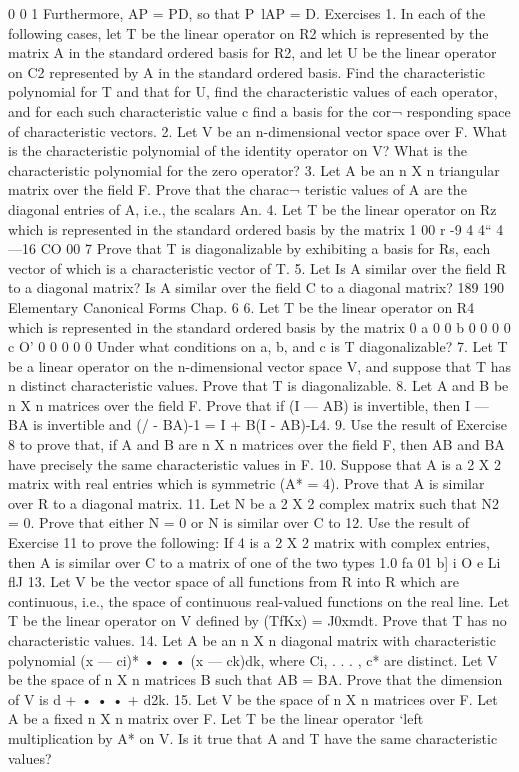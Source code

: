 0 0 1 Furthermore, AP = PD, so that P~lAP = D. Exercises 1. In each of the following cases, let T be the linear operator on R2 which is represented by the matrix A in the standard ordered basis for R2, and let U be the linear operator on C2 represented by A in the standard ordered basis. Find the characteristic polynomial for T and that for U, find the characteristic values of each operator, and for each such characteristic value c find a basis for the cor¬ responding space of characteristic vectors. 2. Let V be an n-dimensional vector space over F. What is the characteristic polynomial of the identity operator on V? What is the characteristic polynomial for the zero operator? 3. Let A be an n X n triangular matrix over the field F. Prove that the charac¬ teristic values of A are the diagonal entries of A, i.e., the scalars An. 4. Let T be the linear operator on Rz which is represented in the standard ordered basis by the matrix 1 00 r -9 4 4“ 4  —16 CO 00 7 Prove that T is diagonalizable by exhibiting a basis for Rs, each vector of which is a characteristic vector of T. 5. Let Is A similar over the field R to a diagonal matrix? Is A similar over the field C to a diagonal matrix? 189 190 Elementary Canonical Forms Chap. 6 6. Let T be the linear operator on R4 which is represented in the standard ordered basis by the matrix 0 a 0 0 b 0 0 0 0 c O' 0 0 0 0 0 Under what conditions on a, b, and c is T diagonalizable? 7. Let T be a linear operator on the n-dimensional vector space V, and suppose that T has n distinct characteristic values. Prove that T is diagonalizable. 8. Let A and B be n X n matrices over the field F. Prove that if (I — AB) is invertible, then I — BA is invertible and (/ - BA)-1 = I + B(I - AB)-L4. 9. Use the result of Exercise 8 to prove that, if A and B are n X n matrices over the field F, then AB and BA have precisely the same characteristic values in F. 10. Suppose that A is a 2 X 2 matrix with real entries which is symmetric (A* = 4). Prove that A is similar over R to a diagonal matrix. 11. Let N be a 2 X 2 complex matrix such that N2 = 0. Prove that either N = 0 or N is similar over C to 12. Use the result of Exercise 11 to prove the following: If 4 is a 2 X 2 matrix with complex entries, then A is similar over C to a matrix of one of the two types 1.0 fa 01 b] i O e Li flJ 13. Let V be the vector space of all functions from R into R which are continuous, i.e., the space of continuous real-valued functions on the real line. Let T be the linear operator on V defined by (TfKx) = J0xmdt. Prove that T has no characteristic values. 14. Let A be an n X n diagonal matrix with characteristic polynomial (x — ci)* • • • (x — ck)dk, where Ci, . . . , c* are distinct. Let V be the space of n X n matrices B such that AB = BA. Prove that the dimension of V is d + • • • + d2k. 15. Let V be the space of n X n matrices over F. Let A be a fixed n X n matrix over F. Let T be the linear operator ‘left multiplication by A* on V. Is it true that A and T have the same characteristic values?
